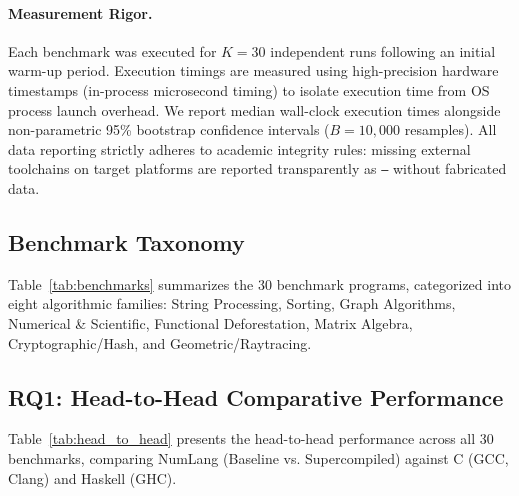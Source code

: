 \paragraph{Measurement Rigor.}
Each benchmark was executed for $K=30$ independent runs following an initial warm-up period. Execution timings are measured using high-precision hardware timestamps (in-process microsecond timing) to isolate execution time from OS process launch overhead. We report median wall-clock execution times alongside non-parametric 95\% bootstrap confidence intervals ($B=10,000$ resamples). All data reporting strictly adheres to academic integrity rules: missing external toolchains on target platforms are reported transparently as \texttt{--} without fabricated data.

\subsection{Benchmark Taxonomy}
Table~\ref{tab:benchmarks} summarizes the 30 benchmark programs, categorized into eight algorithmic families: String Processing, Sorting, Graph Algorithms, Numerical & Scientific, Functional Deforestation, Matrix Algebra, Cryptographic/Hash, and Geometric/Raytracing.



\subsection{RQ1: Head-to-Head Comparative Performance}
Table~\ref{tab:head_to_head} presents the head-to-head performance across all 30 benchmarks, comparing NumLang (Baseline vs. Supercompiled) against C (GCC, Clang) and Haskell (GHC).



